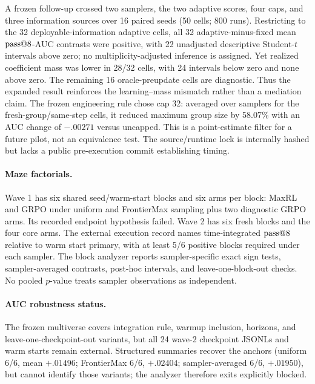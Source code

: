 A frozen follow-up crossed two samplers, the two adaptive scores, four caps,
and three information sources over 16 paired seeds (50 cells; 800 runs).
Restricting to the 32 deployable-information adaptive cells, all 32
adaptive-minus-fixed mean $\text{pass@}8$-AUC contrasts were positive, with 22
unadjusted descriptive Student-$t$ intervals above zero; no
multiplicity-adjusted inference is assigned. Yet realized coefficient mass
was lower in 28/32 cells, with 24 intervals below zero and none above zero.
The remaining 16 oracle-preupdate cells are diagnostic. Thus the expanded
result reinforces the learning--mass mismatch rather than a mediation claim.
The frozen engineering rule chose cap 32: averaged
over samplers for the fresh-group/same-step cells, it reduced maximum group
size by 58.07\% with an AUC change of $-.00271$ versus uncapped. This is a
point-estimate filter for a future pilot, not an equivalence test. The
source/runtime lock is internally hashed but lacks a public pre-execution
commit establishing timing.

\paragraph{Maze factorials.}
Wave 1 has six shared seed/warm-start blocks and six arms per block: MaxRL and
GRPO under uniform and FrontierMax sampling plus two diagnostic GRPO arms.
Its recorded endpoint hypothesis failed. Wave 2 has six fresh blocks and
the four core arms. The external execution record names time-integrated $\text{pass@}8$
relative to warm start primary, with at least 5/6 positive blocks required
under each sampler. The block analyzer reports sampler-specific exact sign
tests, sampler-averaged contrasts, post-hoc intervals, and
leave-one-block-out checks. No pooled $p$-value treats sampler observations
as independent.

\paragraph{AUC robustness status.}
The frozen multiverse covers integration rule, warmup inclusion, horizons,
and leave-one-checkpoint-out variants, but all 24 wave-2 checkpoint JSONLs and
warm starts remain external. Structured summaries recover the anchors
(uniform 6/6, mean $+.01496$; FrontierMax 6/6, $+.02404$;
sampler-averaged 6/6, $+.01950$), but cannot identify those variants; the
analyzer therefore exits explicitly blocked.

